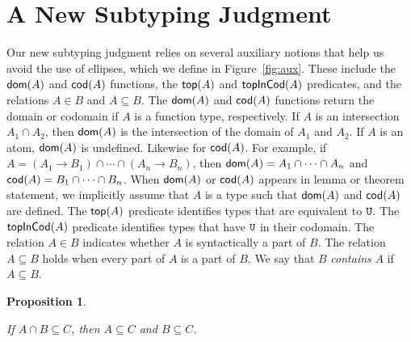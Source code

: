 \documentclass{article}
\newtheorem{proposition}[theorem]{Proposition}
\begin{document}

\section{A New Subtyping Judgment}
\label{sec:new-subtyping}

Our new subtyping judgment relies on several auxiliary notions that
help us avoid the use of ellipses, which we define in
Figure~\ref{fig:aux}. These include the $\mathsf{dom}(A)$ and $\mathsf{cod}(A)$
functions, the $\mathsf{top}(A)$ and $\mathsf{topInCod}(A)$ predicates, and the
relations $A \in B$ and $A \subseteq B$.
%
The $\mathsf{dom}(A)$ and $\mathsf{cod}(A)$ functions return the domain or codomain if
$A$ is a function type, respectively. If $A$ is an intersection $A_1 \cap
A_2$, then $\mathsf{dom}(A)$ is the intersection of the domain of $A_1$ and
$A_2$.  If $A$ is an atom, $\mathsf{dom}(A)$ is undefined. Likewise for
$\mathsf{cod}(A)$. For example, if $A = (A_1 \to B_1) \cap \cdots \cap (A_n \to B_n)$,
then $\mathsf{dom}(A) = A_1 \cap \cdots \cap A_n$ and $\mathsf{cod}(A) = B_1 \cap \cdots \cap
B_n$.  When $\mathsf{dom}(A)$ or $\mathsf{cod}(A)$ appears in lemma or theorem
statement, we implicitly assume that $A$ is a type such that $\mathsf{dom}(A)$
and $\mathsf{cod}(A)$ are defined.
%
The $\mathsf{top}(A)$ predicate identifies types that are equivalent to
$\mathtt{U}$. The $\mathsf{topInCod}(A)$ predicate identifies types that have $\mathtt{U}$
in their codomain.
%
The relation $A \in B$ indicates whether $A$ is syntactically a part of $B$.
The relation $A \subseteq B$ holds when every part of $A$ is a part of $B$.
We say that $B$ \emph{contains} $A$ if $A \subseteq B$.

\begin{proposition}\label{prop:union-subset-inv}
 \item If $A \cap B \subseteq C$, then $A \subseteq C$ and $B \subseteq C$. 
\end{proposition}
\end{document}
